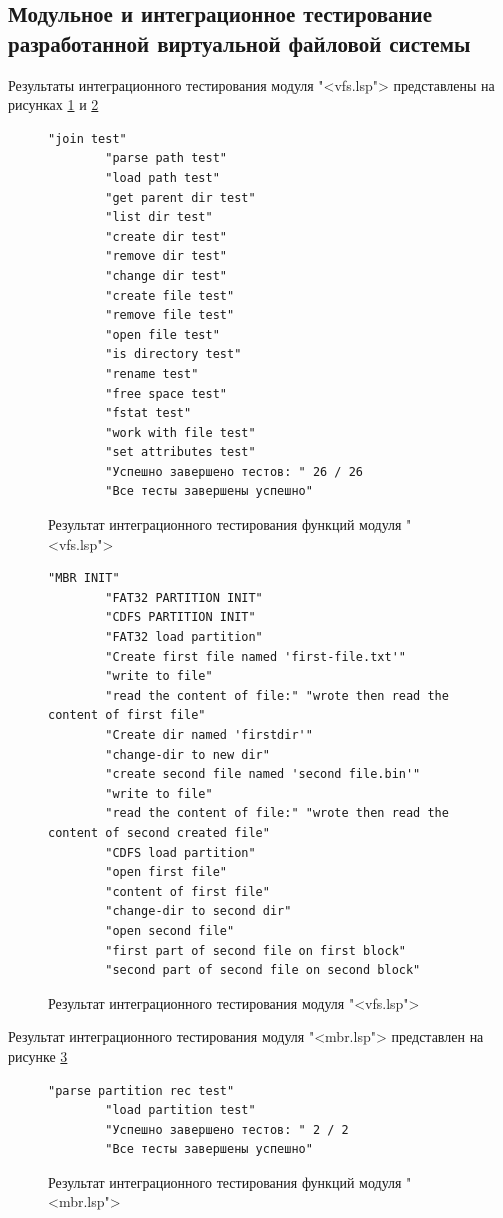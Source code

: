 \subsection{Модульное и интеграционное тестирование разработанной виртуальной файловой системы}

Результаты интеграционного тестирования модуля "<vfs.lsp"> представлены на рисунках \ref{unitIVFS:image} и \ref{unitIVFSdisk:image}

\begin{figure}[H]
	\begin{lstlisting}[language={}]
		"join test"
		"parse path test"
		"load path test"
		"get parent dir test"
		"list dir test"
		"create dir test"
		"remove dir test"
		"change dir test"
		"create file test"
		"remove file test"
		"open file test"
		"is directory test"
		"rename test"
		"free space test"
		"fstat test"
		"work with file test"
		"set attributes test"
		"Успешно завершено тестов: " 26 / 26
		"Все тесты завершены успешно"
	\end{lstlisting}  
	\caption{Результат интеграционного тестирования функций модуля "<vfs.lsp">}
	\label{unitIVFS:image}
\end{figure}

\begin{figure}[H]
	\begin{lstlisting}[language={}]
		"MBR INIT"
		"FAT32 PARTITION INIT"
		"CDFS PARTITION INIT"
		"FAT32 load partition"
		"Create first file named 'first-file.txt'"
		"write to file"
		"read the content of file:" "wrote then read the content of first file"
		"Create dir named 'firstdir'"
		"change-dir to new dir"
		"create second file named 'second file.bin'"
		"write to file"
		"read the content of file:" "wrote then read the content of second created file"
		"CDFS load partition"
		"open first file"
		"content of first file"
		"change-dir to second dir"
		"open second file"
		"first part of second file on first block"
		"second part of second file on second block"
	\end{lstlisting}  
	\caption{Результат интеграционного тестирования модуля "<vfs.lsp">}
	\label{unitIVFSdisk:image}
\end{figure}

Результат интеграционного тестирования модуля "<mbr.lsp"> представлен на рисунке \ref{unitMBR:image}

\begin{figure}[H]
	\begin{lstlisting}[language={}]
		"parse partition rec test"
		"load partition test"
		"Успешно завершено тестов: " 2 / 2
		"Все тесты завершены успешно"
	\end{lstlisting}  
	\caption{Результат интеграционного тестирования функций модуля "<mbr.lsp">}
	\label{unitMBR:image}
\end{figure}

